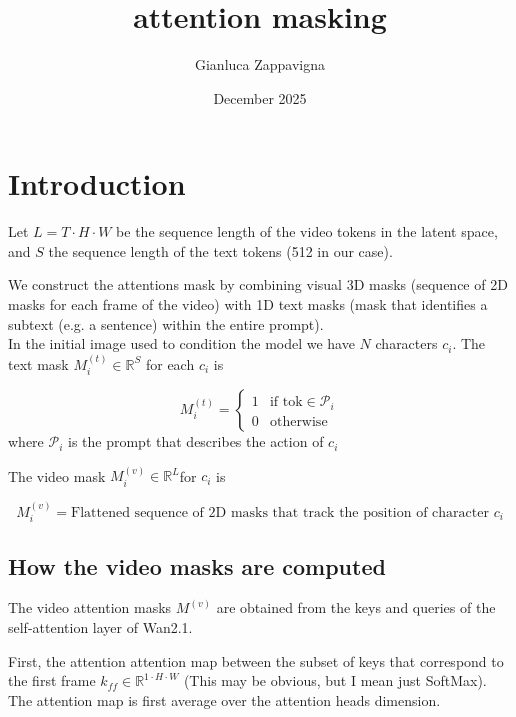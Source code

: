 \documentclass{article}
\title{attention masking}
\author{Gianluca Zappavigna}
\date{December 2025}
\begin{document}
\maketitle

\section{Introduction}


Let $ L = T \cdot H \cdot W$ be the sequence length of the video tokens in the latent space, and $S$ the sequence length of the text tokens (512 in our case).

We construct the attentions mask by combining visual 3D masks (sequence of 2D masks for each frame of the video) with 1D text masks (mask that identifies a subtext (e.g. a sentence) within the entire prompt). \\


In the initial image used to condition the model we have $N$ characters $c_i$.
The text mask $M^{(t)}_{i} \in \mathbb{R}^{S}$ for each $c_i$ is 

\[
M^{(t)}_{i} = \begin{cases}
1 & \text{if } \text{tok} \in \mathcal{P}_i  \\
0 & \text{otherwise}
\end{cases}
\]
where $\mathcal{P}_i$ is the prompt that describes the action of $c_i$

The video mask $M^{(v)}_{i} \in \mathbb{R}^{L}$for $c_i$ is

\[
M^{(v)}_{i} = \text{Flattened sequence of 2D masks that track the position of character } c_i
\]
\subsection{How the video masks are computed}
The video attention masks $M^{(v)}$ are obtained from the keys and queries of the self-attention layer of Wan2.1.

First, the attention attention map between the subset of keys that correspond to the first frame $k_{ff} \in \mathbb{R}^{1\cdot H \cdot W}$ (This may be obvious, but I mean just SoftMax). The attention map is first average over the attention heads dimension.
\end{document}
